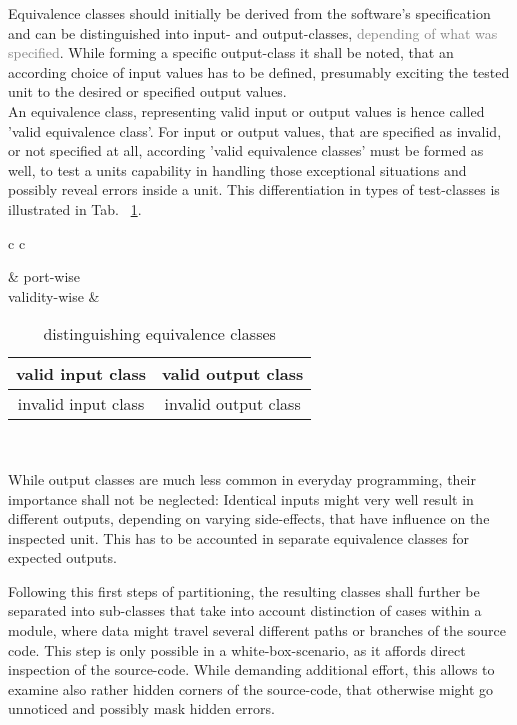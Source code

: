 \documentclass[master,english,smartquotes,apa]{hgbthesis}
\newcommand{\GREY}[1]{\textcolor{gray}{#1}}
\begin{document}
	Equivalence classes should initially be derived from the software's specification and can be distinguished into input- and output-classes, \GREY{ depending of what was specified}. While forming a specific output-class it shall be noted, that an according choice of input values has to be defined, presumably exciting the tested unit to the desired or specified output values. \\
	An equivalence class, representing valid input or output values is hence called 'valid equivalence class'. For input or output values, that are specified as invalid, or not specified at all, according 'valid equivalence classes' must be formed as well, to test a units capability in handling those exceptional situations and possibly reveal errors inside a unit. This differentiation in types of test-classes is illustrated in Tab. ~\ref{EquiClasses}.
	
	\begin{table}[h!]
	\begin{center}
		\begin{tabular}{c c}
		
						& port-wise  \\
		validity-wise	& \begin{tabular}{|c | c|} \hline
						valid input class 	& valid output class   \\  \hline
						invalid input class 	& invalid output class \\ \hline
							\end{tabular}		\\ %
		\end{tabular}
			\caption{distinguishing equivalence classes}
			\label{EquiClasses}
	\end{center}
	\end{table}
	While output classes are much less common in everyday programming, their importance shall not be neglected: Identical inputs might very well result in different outputs, depending on varying side-effects, that have influence on the inspected unit. This has to be accounted in separate equivalence classes for expected outputs.
	
	Following this first steps of partitioning, the resulting classes shall further be separated into sub-classes that take into account distinction of cases within a module, where data might travel several different paths or branches of the source code. This step is only possible in a white-box-scenario, as it affords direct inspection of the source-code. While demanding additional effort, this allows to examine also rather hidden corners of the source-code, that otherwise might go unnoticed and possibly mask hidden errors.
\end{document}
